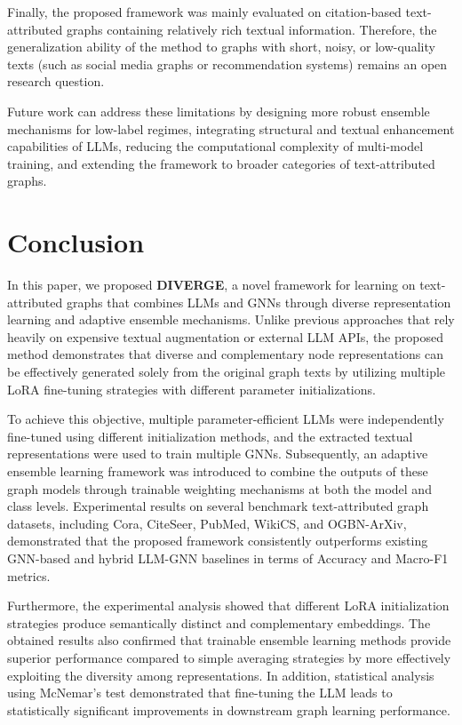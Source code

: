 \documentclass[a4paper,fleqn]{cas-sc}
\begin{document}
Finally, the proposed framework was mainly evaluated on citation-based text-attributed graphs containing relatively rich textual information. Therefore, the generalization ability of the method to graphs with short, noisy, or low-quality texts (such as social media graphs or recommendation systems) remains an open research question.

Future work can address these limitations by designing more robust ensemble mechanisms for low-label regimes, integrating structural and textual enhancement capabilities of LLMs, reducing the computational complexity of multi-model training, and extending the framework to broader categories of text-attributed graphs.

\section{Conclusion}\label{sec:Conclusion}

In this paper, we proposed \textbf{DIVERGE}, a novel framework for learning on text-attributed graphs that combines LLMs and GNNs through diverse representation learning and adaptive ensemble mechanisms. Unlike previous approaches that rely heavily on expensive textual augmentation or external LLM APIs, the proposed method demonstrates that diverse and complementary node representations can be effectively generated solely from the original graph texts by utilizing multiple LoRA fine-tuning strategies with different parameter initializations.

To achieve this objective, multiple parameter-efficient LLMs were independently fine-tuned using different initialization methods, and the extracted textual representations were used to train multiple GNNs. Subsequently, an adaptive ensemble learning framework was introduced to combine the outputs of these graph models through trainable weighting mechanisms at both the model and class levels. Experimental results on several benchmark text-attributed graph datasets, including Cora, CiteSeer, PubMed, WikiCS, and OGBN-ArXiv, demonstrated that the proposed framework consistently outperforms existing GNN-based and hybrid LLM-GNN baselines in terms of Accuracy and Macro-F1 metrics.

Furthermore, the experimental analysis showed that different LoRA initialization strategies produce semantically distinct and complementary embeddings. The obtained results also confirmed that trainable ensemble learning methods provide superior performance compared to simple averaging strategies by more effectively exploiting the diversity among representations. In addition, statistical analysis using McNemar's test demonstrated that fine-tuning the LLM leads to statistically significant improvements in downstream graph learning performance.
\end{document}
